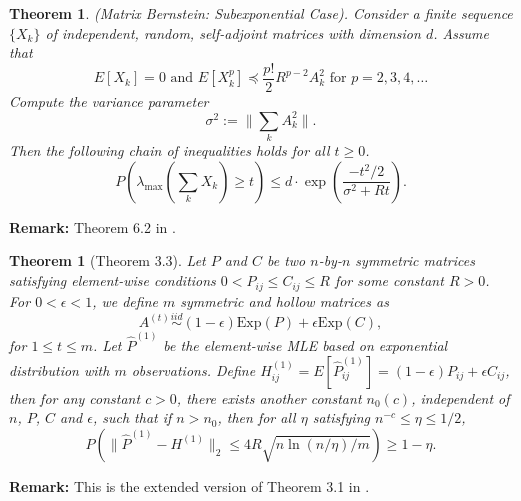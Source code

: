 \documentclass[a4paper]{article}
\newtheorem{theorem}[fact]{Theorem}
\begin{document}
\begin{theorem}
\label{thm:BernsteinMatrix}
(Matrix Bernstein: Subexponential Case). Consider a finite sequence $\{X_k\}$ of
independent, random, self-adjoint matrices with dimension $d$. Assume that
\[
	E[X_k] = 0 \text{\ \ \ and \ \ \ }  E[X_k^p] \preceq \frac{p!}{2} R^{p-2} A_k^2 \text{\ \ for } p = 2,3,4, \dots
\]
Compute the variance parameter
\[
	\sigma^2 := \|\sum_k A_k^2\|.
\]
Then the following chain of inequalities holds for all $t \ge 0$.
\[
	P \left( \lambda_{\max} \left( \sum_k X_k \right) \ge t \right) \le d \cdot \exp \left( \frac{-t^2/2}{\sigma^2 + R t} \right).
\]
\end{theorem}
\textbf{Remark:} Theorem 6.2 in \cite{tropp2012user}.








\begin{theorem}[Theorem 3.3]
\label{thm:P1Diff}
Let $P$ and $C$ be two $n$-by-$n$ symmetric matrices satisfying element-wise conditions $0 < P_{ij} \le C_{ij} \le R$ for some constant $R > 0$. For $0 < \epsilon < 1$, we define $m$ symmetric and hollow matrices as
\[
	A^{(t)} \stackrel{iid}{\sim} (1-\epsilon) \mathrm{Exp}(P) + \epsilon \mathrm{Exp}(C),
\]
for $1 \le t \le m$.
Let $\hat{P}^{(1)}$ be the element-wise MLE based on exponential distribution with $m$ observations.
Define $H_{ij}^{(1)} = E[\hat{P}_{ij}^{(1)}] = (1-\epsilon) P_{ij} + \epsilon C_{ij}$,
then for any constant $c > 0$, there exists another constant $n_0(c)$, independent of $n$, $P$, $C$ and $\epsilon$, such that if $n > n_0$, then for all $\eta$ satisfying $n^{-c} \le \eta \le 1/2$,
\[
	P \left( \| \hat{P}^{(1)} - H^{(1)} \|_2 \le 4 R \sqrt{n \ln(n/\eta)/m}\right) \ge 1 - \eta.
\]
\end{theorem}
\textbf{Remark:} This is the extended version of Theorem 3.1 in \cite{oliveira2009concentration}.
\end{document}

